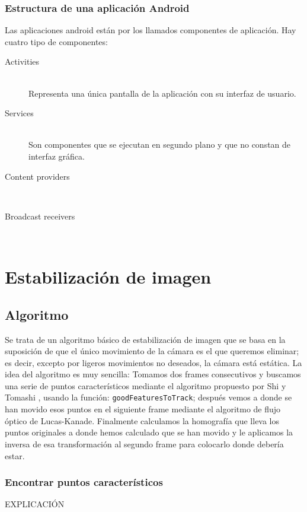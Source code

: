 \documentclass[a4paper,openright, 12pt]{book}
\begin{document}
\subsection*{Estructura de una aplicación Android}
Las aplicaciones android están por los llamados componentes de aplicación. Hay cuatro tipo de componentes:
\begin{description}
  \item[Activities] \hfill \\
  Representa una única pantalla de la aplicación con su interfaz de usuario.
  \item[Services] \hfill \\
  Son componentes que se ejecutan en segundo plano y que no constan de interfaz gráfica.
  \item[Content providers] \hfill \\
  \item[Broadcast receivers] \hfill \\
\end{description}

\chapter{Estabilización de imagen}\label{cap.}

\section{Algoritmo}
Se trata de un algoritmo básico de estabilización de imagen que se basa en la suposición de que el único movimiento de la cámara es el que queremos eliminar; es decir, excepto por ligeros movimientos no deseados, la cámara está estática.
La idea del algoritmo es muy sencilla: 
Tomamos dos frames consecutivos y buscamos una serie de puntos característicos mediante el algoritmo propuesto por Shi y Tomashi \cite{shiandtomasi}, usando la función: \lstinline{goodFeaturesToTrack}; después vemos a donde se han movido esos puntos en el siguiente frame mediante el algoritmo de flujo óptico de Lucas-Kanade.
Finalmente calculamos la homografía que lleva los puntos originales a donde hemos calculado que se han movido y le aplicamos la inversa de esa transformación al segundo frame para colocarlo donde debería estar.
\subsection{Encontrar puntos característicos}

EXPLICACIÓN
\end{document}
